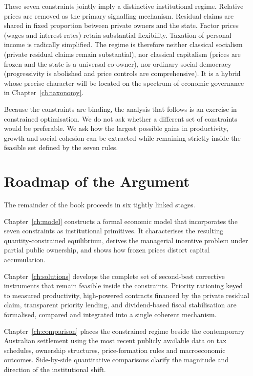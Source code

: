 \documentclass[12pt,anyside]{book}
\theoremstyle{definition}
\theoremstyle{plain}
\theoremstyle{remark}
\begin{document}
These seven constraints jointly imply a distinctive institutional regime. Relative prices are removed as the primary signalling mechanism. Residual claims are shared in fixed proportion between private owners and the state. Factor prices (wages and interest rates) retain substantial flexibility. Taxation of personal income is radically simplified. The regime is therefore neither classical socialism (private residual claims remain substantial), nor classical capitalism (prices are frozen and the state is a universal co-owner), nor ordinary social democracy (progressivity is abolished and price controls are comprehensive). It is a hybrid whose precise character will be located on the spectrum of economic governance in Chapter~\ref{ch:taxonomy}.

Because the constraints are binding, the analysis that follows is an exercise in constrained optimisation. We do not ask whether a different set of constraints would be preferable. We ask how the largest possible gains in productivity, growth and social cohesion can be extracted while remaining strictly inside the feasible set defined by the seven rules.

\section{Roadmap of the Argument}

The remainder of the book proceeds in six tightly linked stages.

Chapter~\ref{ch:model} constructs a formal economic model that incorporates the seven constraints as institutional primitives. It characterises the resulting quantity-constrained equilibrium, derives the managerial incentive problem under partial public ownership, and shows how frozen prices distort capital accumulation.

Chapter~\ref{ch:solutions} develops the complete set of second-best corrective instruments that remain feasible inside the constraints. Priority rationing keyed to measured productivity, high-powered contracts financed by the private residual claim, transparent priority lending, and dividend-based fiscal stabilisation are formalised, compared and integrated into a single coherent mechanism.

Chapter~\ref{ch:comparison} places the constrained regime beside the contemporary Australian settlement using the most recent publicly available data on tax schedules, ownership structures, price-formation rules and macroeconomic outcomes. Side-by-side quantitative comparisons clarify the magnitude and direction of the institutional shift.
\end{document}
